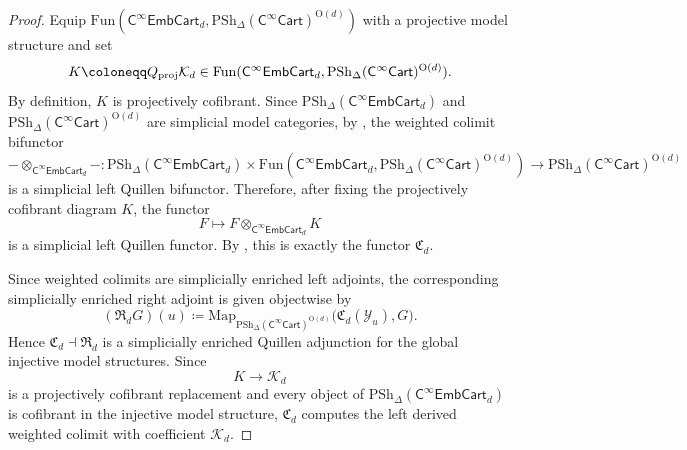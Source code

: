 \documentclass{amsart}
\newcommand{\cat}[1]{\mathsf{#1}}
\newcommand{\proj}{\textnormal{proj}}
\newcommand{\Cart}{\cat{C}^{\infty}\cat{Cart}}
\newcommand{\fembcartnoniso}[1]{\cat{C}^{\infty}\cat{EmbCart}_{#1}}
\newcommand{\Fun}{\mathrm{Fun}}
\newcommand{\Map}{\mathrm{Map}}
\newcommand{\spsh}{\mathrm{PSh}_{\Delta}}
\newcommand{\Cc}{\mathfrak{C}}
\newcommand{\Yo}{\mathscr{Y}}
\theoremstyle{definition}
\numberwithin{equation}{subsection}
\numberwithin{subsubsection}{subsection}
\begin{document}
\begin{proof}
  Equip
  \(\Fun(\fembcartnoniso{d}, {\spsh(\Cart)}^{\mathrm{O}(d)})\) with a
  projective model structure and set
  \[
    K \coloneqq Q_{\proj}\mathcal{K}_d
    \in \Fun(\fembcartnoniso{d},\spsh(\Cart)^{\mathrm{O}(d)}).
  \]
  By definition, \(K\) is projectively cofibrant. Since
  \(\spsh(\fembcartnoniso{d})\) and \(\spsh(\Cart)^{\mathrm{O}(d)}\) are
  simplicial model categories, by
  , the weighted
  colimit bifunctor
  \[
    - \otimes_{\fembcartnoniso{d}} - :
    \spsh(\fembcartnoniso{d})
    \times
    \Fun(\fembcartnoniso{d},\spsh(\Cart)^{\mathrm{O}(d)})
    \longrightarrow
    \spsh(\Cart)^{\mathrm{O}(d)}
  \]
  is a simplicial left Quillen bifunctor. Therefore, after fixing the
  projectively cofibrant diagram \(K\), the functor
  \[
    F \longmapsto F\otimes_{\fembcartnoniso{d}} K
  \]
  is a simplicial left Quillen functor. By
  , this is exactly the functor
  \(\Cc_d\).

  Since weighted colimits are simplicially enriched left adjoints, the
  corresponding simplicially enriched right adjoint is given objectwise by
  \[
    (\mathfrak{R}_d G)(u)
    \coloneqq
    \Map_{\spsh(\Cart)^{\mathrm{O}(d)}}
    \bigl(\Cc_d(\Yo_u), G\bigr).
  \]
  Hence \(\Cc_d \dashv \mathfrak{R}_d\) is a simplicially enriched
  Quillen adjunction for the global injective model structures. Since
  \[
    K \longrightarrow \mathcal{K}_d
  \]
  is a projectively cofibrant replacement and every object of
  \(\spsh(\fembcartnoniso{d})\) is cofibrant in the injective model structure,
  \(\Cc_d\) computes the left derived weighted colimit with coefficient
  \(\mathcal{K}_d\).


\end{proof}
\end{document}
